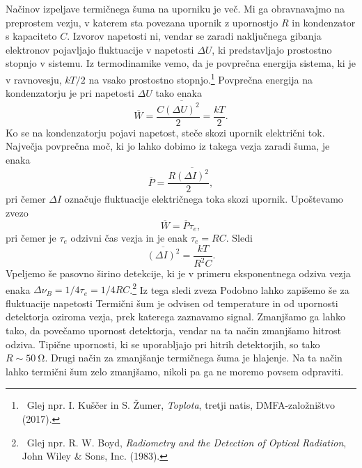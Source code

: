Načinov izpeljave termičnega šuma na uporniku je več. Mi ga obravnavajmo na preprostem vezju, 
v katerem sta povezana upornik z upornostjo $R$ in kondenzator s kapaciteto $C$. Izvorov 
napetosti ni, vendar se zaradi naključnega gibanja elektronov pojavljajo fluktuacije v 
napetosti $\Delta U$, ki predstavljajo prostostno stopnjo v sistemu.  
Iz termodinamike vemo, da je povprečna energija sistema, ki je v 
ravnovesju, $kT/2$ na vsako prostostno stopnjo.\footnote{~Glej
npr. I. Kuščer in S. Žumer, {\it Toplota}, tretji natis, DMFA-založništvo (2017).}
Povprečna energija na kondenzatorju 
je pri napetosti $\Delta U$ tako enaka
\begin{equation}
\overline{W} = \frac{C\overline{(\Delta U)^2}}{2} = \frac{kT}{2}.
\end{equation}
Ko se na kondenzatorju pojavi napetost, steče skozi upornik električni tok. 
Največja povprečna moč, ki jo lahko dobimo iz takega vezja zaradi šuma, je enaka 
\begin{equation}
\overline{P} = \frac{R \overline{(\Delta I)^2}}{2},
\end{equation}
pri čemer $\Delta I$ označuje fluktuacije električnega toka skozi upornik.
Upoštevamo zvezo
\begin{equation}
\overline{W} = \overline{P}\tau_e,
\end{equation}
pri čemer je $\tau_e$ odzivni čas vezja in je enak $\tau_e = RC$. Sledi 
\begin{equation}
\overline{(\Delta I)^2} = \frac{kT}{R^2C}.
\end{equation}
Vpeljemo še pasovno širino detekcije, ki je v primeru eksponentnega odziva vezja enaka
$\Delta \nu_B = 1/4\tau_e = 1/4RC$.\footnote{~Glej npr. R. W. Boyd, 
{\it Radiometry and the Detection of Optical Radiation}, John Wiley \& Sons, Inc. (1983).} 
Iz tega sledi zveza
Podobno lahko zapišemo še za fluktuacije napetosti 
Termični šum je odvisen od temperature in od upornosti detektorja oziroma
vezja, prek katerega zaznavamo signal. Zmanjšamo ga lahko tako, da 
povečamo upornost detektorja, vendar na ta način zmanjšamo hitrost
odziva. Tipične upornosti, ki se uporabljajo pri hitrih detektorjih, so 
tako $R \sim 50~\si{\ohm}$. Drugi način za zmanjšanje termičnega šuma je
hlajenje. Na ta način lahko termični šum zelo zmanjšamo, nikoli pa ga ne moremo povsem
odpraviti.  

